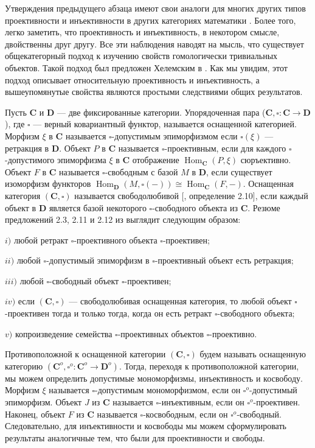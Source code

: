 Утверждения предыдущего абзаца имеют свои аналоги для многих других типов проективности и инъективности в других категориях математики \cite{SemadeniProjInjDual}. Более того, легко заметить, что проективность и инъективность, в некотором смысле, двойственны друг другу. Все эти наблюдения наводят на мысль, что существует общекатегорный подход к изучению свойств гомологически тривиальных объектов. Такой подход был предложен Хелемским в \cite{HelMetrFrQMod}. Как мы увидим, этот подход описывает относительную проективность и инъективность, а вышеупомянутые свойства являются простыми следствиями общих результатов. 

Пусть $\mathbf{C}$ и $\mathbf{D}$ --- две фиксированные категории. Упорядоченная пара ($\mathbf{C}, \square:\mathbf{C}\to\mathbf{D}$), где $\square$ --- верный ковариантный функтор, называется оснащенной категорией. Морфизм $\xi$ в $\mathbf{C}$ называется $\square$-допустимым эпиморфизмом если $\square (\xi)$ --- ретракция в $\mathbf{D}$. Объект $P$ в $\mathbf{C}$ называется $\square$-проективным, если для каждого $\square$-допустимого эпиморфизма $\xi$ в $\mathbf{C}$ отображение $\operatorname{Hom}_{\mathbf{C}}(P,\xi)$ сюръективно. Объект $F$ в $\mathbf{C}$ называется $\square$-свободным с базой $M$ в  $\mathbf{D}$, если существует изоморфизм функторов $\operatorname{Hom}_{\mathbf{D}}(M,\square(-))\cong\operatorname{Hom}_{\mathbf{C}}(F,-)$. Оснащенная категория $(\mathbf{C},\square)$ называется свободолюбивой [\cite{HelMetrFrQMod}, определение 2.10], если каждый объект в $\mathbf{D}$ является базой некоторого $\square$-свободного объекта из $\mathbf{C}$. Резюме предложений 2.3, 2.11  и 2.12 из \cite{HelMetrFrQMod} выглядит следующим образом:

$i)$ любой ретракт $\square$-проективного объекта $\square$-проективен;

$ii)$ любой $\square$-допустимый эпиморфизм в $\square$-проективный объект есть ретракция;

$iii)$ любой $\square$-свободный объект $\square$-проективен;

$iv)$ если $(\mathbf{C},\square)$ --- свободолюбивая оснащенная категория, то любой объект $\square$-проективен тогда и только тогда, когда он есть ретракт $\square$-свободного объекта;

$v)$ копроизведение семейства $\square$-проективных объектов $\square$-проективно.

Противоположной к оснащенной категории $(\mathbf{C}, \square)$ 
будем называть оснащенную категорию $(\mathbf{C}^{o},\square^{o}:\mathbf{C}^{o}\to\mathbf{D}^{o})$. 
Тогда, переходя к противоположной категории, мы можем определить допустимые мономорфизмы, инъективность и косвободу. Морфизм $\xi$ называется $\square$-допустимым мономорфизмом, если он $\square^o$-допустимый эпиморфизм. Объект $J$ из $\mathbf{C}$ называется $\square$-инъективным, если он $\square^o$-проективен. Наконец, объект $F$ из $\mathbf{C}$ называется $\square$-косвободным, если он $\square^o$-свободный. Следовательно, для инъективности и косвободы мы можем сформулировать результаты аналогичные тем, что были для проективности и свободы.

